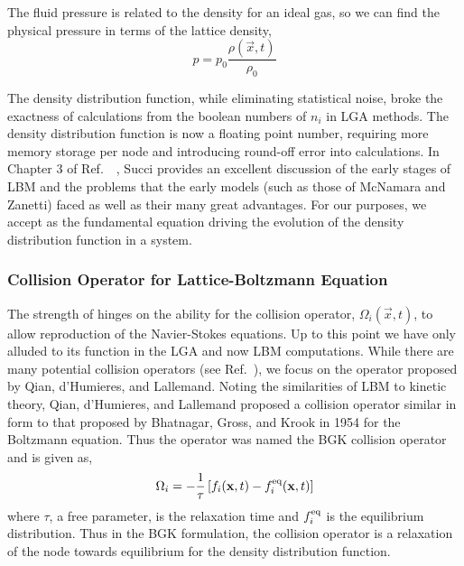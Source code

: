 The fluid pressure is related to the density for an ideal gas, so we can find the physical pressure in terms of the lattice density,
\begin{equation}
	p = p_0\frac{\rho(\vec{x},t)}{\rho_0}
\end{equation}

The density distribution function, while eliminating statistical noise, broke the exactness of calculations from the boolean numbers of $n_i$ in LGA methods. The density distribution function is now a floating point number, requiring more memory storage per node and introducing round-off error into calculations. In Chapter 3 of Ref.~\cite{succi2001lattice}~, Succi provides an excellent discussion of the early stages of LBM and the problems that the early models (such as those of McNamara and Zanetti) faced as well as their many great advantages. For our purposes, we accept  as the fundamental equation driving the evolution of the density distribution function in a system.



\subsubsection{Collision Operator for Lattice-Boltzmann Equation}

The strength of  hinges on the ability for the collision operator, $\Omega_i(\vec{x},t)$, to allow reproduction of the Navier-Stokes equations. Up to this point we have only alluded to its function in the LGA and now LBM computations. While there are many potential collision operators (see Ref.~\cite{succi2001lattice}), we focus on the operator proposed by Qian, d’Humieres, and Lallemand.\cite{qian1992lattice} Noting the similarities of LBM to kinetic theory, Qian, d'Humieres, and Lallemand proposed a collision operator similar in form to that proposed by Bhatnagar, Gross, and Krook in 1954 for the Boltzmann equation.\cite{Bhatnagar1954a} Thus the operator was named the BGK collision operator and is given as,
\begin{equation}\label{eq:bgk-operator}
	\Omega_i = -\frac{1}{\tau}\left[f_i(\mathbf{x},t) - f_i^{\text{eq}}(\mathbf{x},t)\right]
\end{equation}
where $\tau$, a free parameter, is the relaxation time and $f_i^{\text{eq}}$ is the equilibrium distribution. Thus in the BGK formulation, the collision operator is a relaxation of the node towards equilibrium for the density distribution function.\cite{Bhatnagar1954a}

